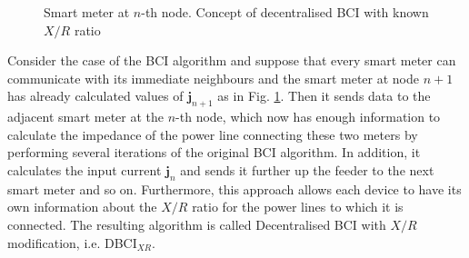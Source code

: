 \documentclass[journal,10pt,onecolumn,draftclsnofoot,]{IEEEtran}
\theoremstyle{plain}
\theoremstyle{definition}
\theoremstyle{remark}
\begin{document}
\begin{figure}[t]
\centering
{}
\caption{Smart meter at $n$-th node. Concept of decentralised BCI with known $X/R$ ratio}
\label{SM_n_bci}
\end{figure}

Consider the case of the BCI algorithm and suppose that every smart meter can communicate with its immediate neighbours and the smart meter at node $n+1$ has already calculated values of $\bm{j}_{n+1}$ as in Fig. \ref{SM_n_bci}. Then it sends data to the adjacent smart meter at the $n$-th node, which now has enough information to calculate the impedance of the power line connecting these two meters by performing several iterations of the original BCI algorithm. In addition, it calculates the input current $\mathbf{j}_{n}$ and sends it further up the feeder to the next smart meter and so on. Furthermore, this approach allows each device to have its own information about the $X/R$ ratio for the power lines to which it is connected. The resulting algorithm is called Decentralised BCI with $X/R$ modification, i.e. DBCI$_{XR}$.
\end{document}
